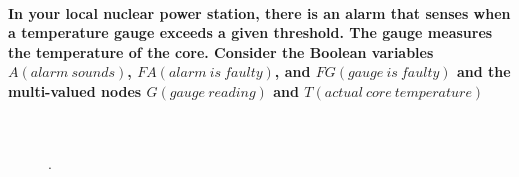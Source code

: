 \documentclass[	DIV=calc,%
				paper=a4,%
				fontsize=11pt,%
				twocolumn]{article}	 %
\begin{document}
\paragraph{In your local nuclear power station, there is an alarm that senses when a temperature gauge exceeds a given threshold.
The gauge measures the temperature of the core. Consider the Boolean variables $A(alarm~sounds)$, $FA(alarm~is~faulty)$, and $FG(gauge~is~faulty)$ and the multi-valued nodes $G(gauge~reading)$ and $T(actual~core~temperature)$
}
~\\
\begin{figure}[h]
  \centering
  \caption{.}
  \usebox{\measurebox}\qquad
  \begin{minipage}[b][\ht\measurebox][s]{0.4\textwidth}


\end{minipage}
\end{figure}
\end{document}
